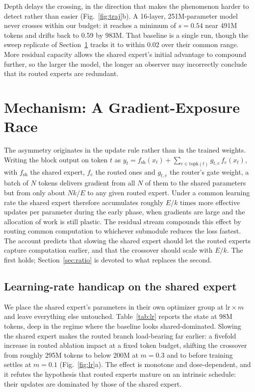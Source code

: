 \documentclass[conference,11pt]{IEEEtran}
\begin{document}
Depth delays the crossing, in the direction that makes the phenomenon harder to detect rather than
easier (Fig.~\ref{fig:traj}b). A 16-layer, 251M-parameter model never crosses within our budget:
it reaches a minimum of $s=0.54$ near 491M tokens and drifts back to 0.59 by 983M. That baseline
is a single run, though the sweep replicate of Section~\ref{sec:mech} tracks it to within 0.02
over their common range. More residual capacity allows the shared expert's initial advantage to
compound further, so the larger the model, the longer an observer may incorrectly conclude that
its routed experts are redundant.

\section{Mechanism: A Gradient-Exposure Race}
\label{sec:mech}

The asymmetry originates in the update rule rather than in the trained weights. Writing the block output on token $t$ as $y_t = f_{\mathrm{sh}}(x_t) +
\sum_{e\in\mathrm{topk}(t)} g_{t,e}\, f_e(x_t)$, with $f_{\mathrm{sh}}$ the shared expert, $f_e$
the routed ones and $g_{t,e}$ the router's gate weight, a batch of $N$ tokens delivers gradient
from all $N$ of them to the shared parameters but from only about $Nk/E$ to any given routed
expert. Under a common learning rate the shared expert therefore accumulates roughly $E/k$ times
more effective updates per parameter during the early phase, when gradients are large and the
allocation of work is still plastic. The residual stream compounds this effect by routing common computation to whichever submodule reduces the loss fastest. The account predicts that slowing the
shared expert should let the routed experts capture computation earlier, and that the crossover
should scale with $E/k$. The first holds; Section~\ref{sec:ratio} is devoted to what replaces the
second.

\subsection{Learning-rate handicap on the shared expert}

We place the shared expert's parameters in their own optimizer group at $\mathrm{lr}\times m$ and
leave everything else untouched. Table~\ref{tab:lr} reports the state at 98M tokens, deep in the
regime where the baseline looks shared-dominated. Slowing the shared expert makes the routed
branch load-bearing far earlier: a fivefold increase in routed ablation impact at a fixed token
budget, shifting the crossover from roughly 295M tokens to below 200M at $m=0.3$ and to before
training settles at $m=0.1$ (Fig.~\ref{fig:lr}a). The effect is monotone and dose-dependent, and
it refutes the hypothesis that routed experts mature on an intrinsic schedule: their updates are
dominated by those of the shared expert.
\end{document}
